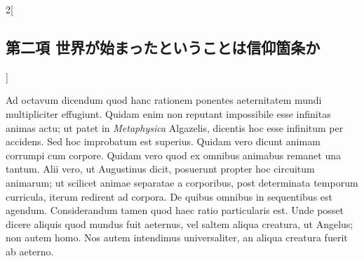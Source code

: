 \documentclass[paper=a4paper,fontsize=10pt,jafontsize=9pt,titlepage]{jlreq}
\begin{document}
\begin{paracol}{2}[\subsection{第二項 世界が始まったということは信仰箇条か}]
\switchcolumn*[\subsection{ad.8}]


Ad octavum dicendum quod hanc rationem ponentes aeternitatem mundi
 multipliciter effugiunt. Quidam enim non reputant impossibile esse
 infinitas animas actu; ut patet in {\itshape Metaphysica} Algazelis, dicentis hoc
 esse infinitum per accidens. Sed hoc improbatum est superius. Quidam
 vero dicunt animam corrumpi cum corpore. Quidam vero quod ex omnibus
 animabus remanet una tantum. Alii vero, ut Augustinus dicit, posuerunt
 propter hoc circuitum animarum; ut scilicet animae separatae a
 corporibus, post determinata temporum curricula, iterum redirent ad
 corpora. De quibus omnibus in sequentibus est agendum. Considerandum
 tamen quod haec ratio particularis est. Unde posset dicere aliquis quod
 mundus fuit aeternus, vel saltem aliqua creatura, ut Angelus; non autem
 homo. Nos autem intendimus universaliter, an aliqua creatura fuerit ab
 aeterno.


\switchcolumn



\end{paracol}
\end{document}
